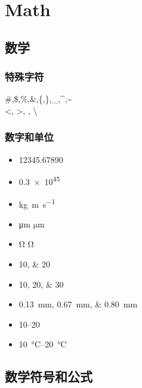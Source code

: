 
\clearpage
\section{Math}

\subsection{数学}

\subsubsection{特殊字符}
\#,\$,\%,\&,\{,\},\_,\^{},\~{}\\
\textless, \textgreater, \textbar, \textbackslash

\subsubsection{数字和单位}

\begin{itemize}
  \item \num{12345.67890}
  \item \num{.3e45}
  \item \si{kg.m.s^{-1}}
  \item \si{\micro\meter} $\si{\micro\meter}$
  \item \si{\ohm} $\si{\ohm}$
  \item \numlist{10;20}
  \item \numlist{10;20;30}
  \item \SIlist{0.13;0.67;0.80}{\milli\metre}
  \item \numrange{10}{20}
  \item \SIrange{10}{20}{\degreeCelsius}
\end{itemize}

\subsection{数学符号和公式}


